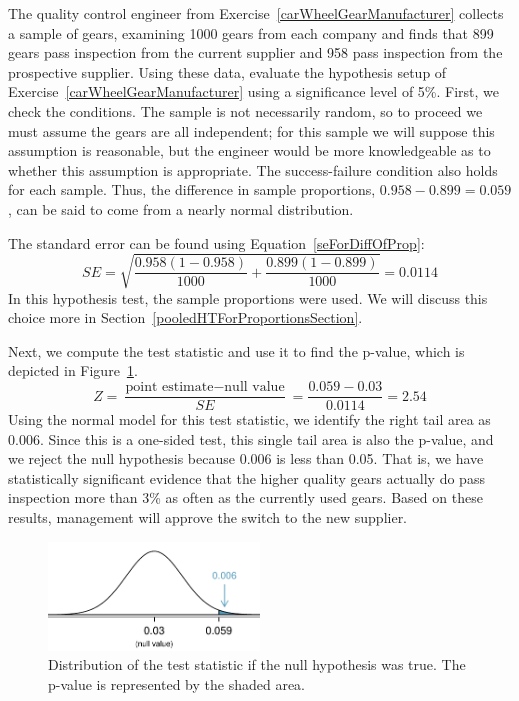 \begin{example}{The quality control engineer from Exercise~\ref{carWheelGearManufacturer} collects a sample of gears, examining 1000 gears from each company and finds that 899 gears pass inspection from the current supplier and 958 pass inspection from the prospective supplier. Using these data, evaluate the hypothesis setup of Exercise~\ref{carWheelGearManufacturer} using a significance level of 5\%.}\label{qualityCtrlEngHypothesisEval}
First, we check the conditions. The sample is not necessarily random, so to proceed we must assume the gears are all independent; for this sample we will suppose this assumption is reasonable, but the engineer would be more knowledgeable as to whether this assumption is appropriate. The success-failure condition also holds for each sample. Thus, the difference in sample proportions, $0.958-0.899=0.059$, can be said to come from a nearly normal distribution.

The standard error can be found using Equation~\eqref{seForDiffOfProp}:
$$SE = \sqrt{\frac{0.958(1-0.958)}{1000} + \frac{0.899(1-0.899)}{1000}} = 0.0114$$
In this hypothesis test, the sample proportions were used. We will discuss this choice more in Section~\ref{pooledHTForProportionsSection}.

Next, we compute the test statistic and use it to find the p-value, which is depicted in Figure~\ref{gearsTwoSampleHTPValueQC}.
$$Z = \frac{\text{point estimate} - \text{null value}}{SE} = \frac{0.059 - 0.03}{0.0114} = 2.54$$
Using the normal model for this test statistic, we identify the right tail area as 0.006. Since this is a one-sided test, this single tail area is also the p-value, and we reject the null hypothesis because 0.006 is less than 0.05. That is, we have statistically significant evidence that the higher quality gears actually do pass inspection more than 3\% as often as the currently used gears. Based on these results, management will approve the switch to the new supplier.
\end{example}

\begin{figure}
\centering
\includegraphics[width=0.5\textwidth]{ch_inference_for_props/figures/gearsTwoSampleHTPValueQC/gearsTwoSampleHTPValueQC}
\caption{Distribution of the test statistic if the null hypothesis was true. The p-value is represented by the shaded area.}
\label{gearsTwoSampleHTPValueQC}
\end{figure}

